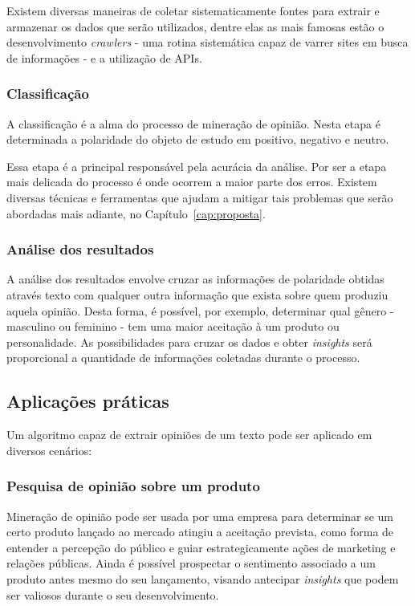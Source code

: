 Existem diversas maneiras de coletar sistematicamente fontes para extrair e armazenar os dados que serão utilizados, dentre elas as mais famosas estão o desenvolvimento \textit{crawlers} - uma rotina sistemática capaz de varrer sites em busca de informações - e a utilização de APIs.

\subsubsection{Classificação}

A classificação é a alma do processo de mineração de opinião. Nesta etapa é determinada a polaridade do objeto de estudo em positivo, negativo e neutro.

Essa etapa é a principal responsável pela acurácia da análise. Por ser a etapa mais delicada do processo é onde ocorrem a maior parte dos erros. Existem diversas técnicas e ferramentas que ajudam a mitigar tais problemas que serão abordadas mais adiante, no Capítulo~\ref{cap:proposta}.

\subsubsection{Análise dos resultados}

A análise dos resultados envolve cruzar as informações de polaridade obtidas através texto com qualquer outra informação que exista sobre quem produziu aquela opinião. Desta forma, é possível, por exemplo, determinar qual gênero - masculino ou feminino - tem uma maior aceitação à um produto ou personalidade. As possibilidades para cruzar os dados e obter \textit{insights} será proporcional a quantidade de informações coletadas durante o processo.

\subsection{Aplicações práticas}

Um algoritmo capaz de extrair opiniões de um texto pode ser aplicado em diversos cenários:

\subsubsection{Pesquisa de opinião sobre um produto}

Mineração de opinião pode ser usada por uma empresa para determinar se um certo produto lançado ao mercado atingiu a aceitação prevista, como forma de entender a percepção do público e guiar estrategicamente ações de marketing e relações públicas. Ainda é possível prospectar o sentimento associado a um produto antes mesmo do seu lançamento, visando antecipar \textit{insights} que podem ser valiosos durante o seu desenvolvimento.

